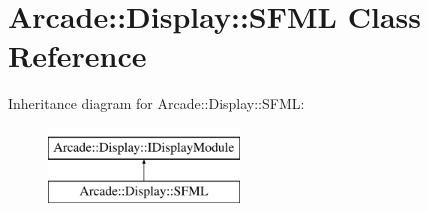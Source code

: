 \hypertarget{classArcade_1_1Display_1_1SFML}{}\section{Arcade\+::Display\+::S\+F\+ML Class Reference}
\label{classArcade_1_1Display_1_1SFML}
Inheritance diagram for Arcade\+::Display\+::S\+F\+ML\+:\begin{figure}[H]
\begin{center}
\leavevmode
\includegraphics[height=2.000000cm]{classArcade_1_1Display_1_1SFML}
\end{center}
\end{figure}
